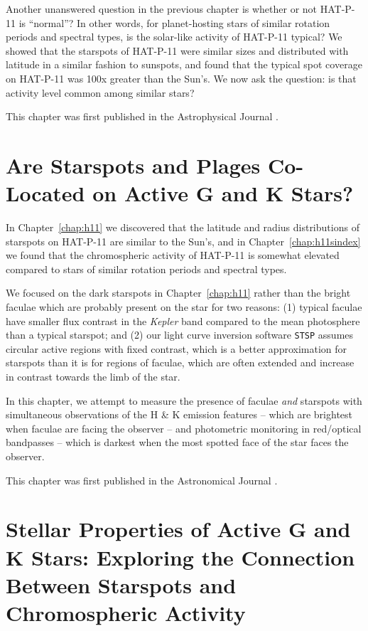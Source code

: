 \documentclass[12pt, twoside]{uwthesis}
\newcommand{\kepler}{\textsl{Kepler}\xspace}
\newcommand{\stsp}{\texttt{STSP}\xspace}
\begin{document}
Another unanswered question in the previous chapter is whether or not HAT-P-11 is ``normal''? In other words, for  planet-hosting stars of similar rotation periods and spectral types, is the solar-like activity of HAT-P-11 typical? We showed that the starspots of HAT-P-11 were similar sizes and distributed with latitude in a similar fashion to sunspots, and found that the typical spot coverage on HAT-P-11 was 100x greater than the Sun's. We now ask the question: is that activity level common among similar stars?

This chapter was first published in the Astrophysical Journal \citep{Morris2017b}.



\chapter{Are Starspots and Plages Co-Located on Active G and K Stars?} \label{chap:nephelion}

In Chapter~\ref{chap:h11} we discovered that the latitude and radius distributions of starspots on HAT-P-11 are similar to the Sun's, and in Chapter~\ref{chap:h11sindex} we found that the chromospheric activity of HAT-P-11 is somewhat elevated compared to stars of similar rotation periods and spectral types. 

We focused on the dark starspots in Chapter~\ref{chap:h11} rather than the bright faculae which are probably present on the star for two reasons: (1) typical faculae have smaller flux contrast in the \kepler band compared to the mean photosphere than a typical starspot; and (2) our light curve inversion software \stsp assumes circular active regions with fixed contrast, which is a better approximation for starspots than it is for regions of faculae, which are often extended and increase in contrast towards the limb of the star. 

In this chapter, we attempt to measure the presence of faculae \textit{and} starspots with simultaneous observations of the  H \& K emission features -- which are brightest when faculae are facing the observer -- and photometric monitoring in red/optical bandpasses -- which is darkest when the most spotted face of the star faces the observer. 

This chapter was first published in the Astronomical Journal \citep{Morris2018g}. 



\chapter{Stellar Properties of Active G and K Stars: Exploring the Connection Between Starspots and Chromospheric Activity} \label{chap:freckles}
\end{document}
